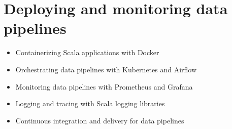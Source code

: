 \chapter{ Deploying and monitoring data pipelines}

\begin{itemize}
    \item Containerizing Scala applications with Docker
    \item Orchestrating data pipelines with Kubernetes and Airflow
    \item Monitoring data pipelines with Prometheus and Grafana
    \item Logging and tracing with Scala logging libraries
    \item Continuous integration and delivery for data pipelines
\end{itemize}
